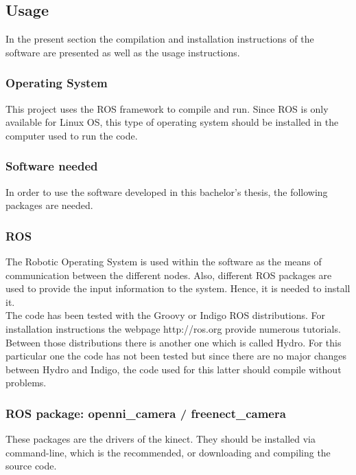 \subsection{Usage}
\label{usage}

In the present section the compilation and installation instructions of the software are presented as well as the usage instructions. 

\subsubsection{Operating System}
This project uses the ROS framework to compile and run. Since ROS is only available for Linux OS, this type of operating system should be installed in the computer used to run the code. 


\subsubsection{Software needed}
In order to use the software developed in this bachelor's thesis, the following packages are needed. 
\subsubsection{ROS}
The Robotic Operating System is used within the software as the means of communication between the different nodes. Also, different ROS packages are used to provide the input information to the system. Hence, it is needed to install it. 
\\

The code has been tested with the Groovy or Indigo ROS distributions. For installation instructions the webpage http://ros.org provide numerous tutorials. 
\\

Between those distributions there is another one which is called Hydro. For this particular one the code has not been tested but since there are no major changes between Hydro and Indigo, the code used for this latter should compile without problems. 


\subsubsection{ROS package: openni\_camera / freenect\_camera}
These packages are the drivers of the kinect. They should be installed via command-line, which is the recommended, or downloading and compiling the source code. 
\\

